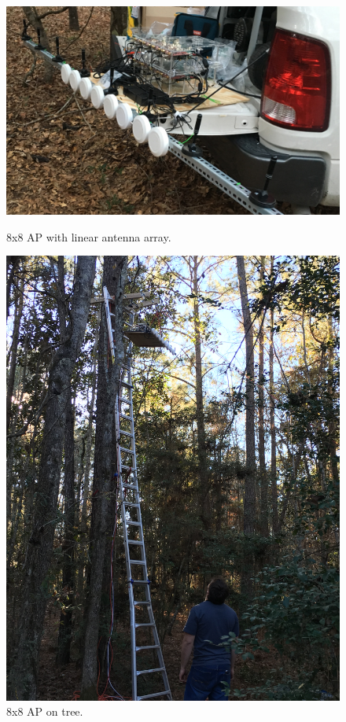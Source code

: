 \begin{figure}[p]
\centering
\begin{minipage}{0.67\textwidth}
\centering
\includegraphics[width=1.0\linewidth]{figs/meas/array_on_truck}
\caption{8x8 \ac{AP} with linear antenna array.}
\label{fig_array_truck}
\end{minipage}
\hfill
\begin{minipage}{0.315\textwidth}
\centering
\includegraphics[width=1.0\linewidth]{figs/meas/array_on_tree}
\caption{8x8 \ac{AP} on tree.}
\label{fig_array_tree}
\end{minipage}
\end{figure}

